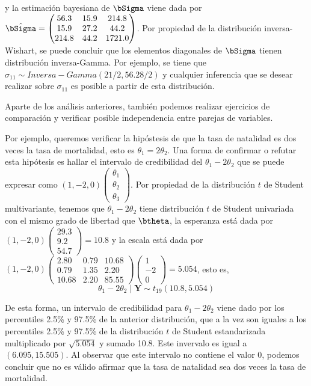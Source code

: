\begin{Eje}
y la estimación bayesiana de $\bSigma$ viene dada por $\hat{\bSigma}=\begin{pmatrix}56.3&15.9&214.8\\15.9&27.2&44.2\\214.8&44.2&1721.0\end{pmatrix}$. Por propiedad de la distribución inversa-Wishart, se puede concluir que los elementos diagonales de $\bSigma$ tienen distribución inversa-Gamma. Por ejemplo, se tiene que $\sigma_{11}\sim Inversa-Gamma(21/2, 56.28/2)$ y cualquier inferencia que se desear realizar sobre $\sigma_{11}$ es posible a partir de esta distribución. 

Aparte de los análisis anteriores, también podemos realizar ejercicios de comparación y verificar posible independencia entre parejas de variables. 

Por ejemplo, queremos verificar la hipóstesis de que la tasa de natalidad es dos veces la tasa de mortalidad, esto es $\theta_1=2\theta_2$. Una forma de confirmar o refutar esta hipótesis es hallar el intervalo de credibilidad del $\theta_1-2\theta_2$ que se puede expresar como $(1,-2,0)\begin{pmatrix}\theta_1\\ \theta_2\\ \theta_3\end{pmatrix}$. Por propiedad de la distribución $t$ de Student multivariante, tenemos que $\theta_1-2\theta_2$ tiene distribución $t$ de Student univariada con el mismo grado de libertad que $\btheta$, la esperanza está dada por $(1,-2,0)\begin{pmatrix}29.3\\9.2\\54.7\end{pmatrix}=10.8$ y la escala está dada por $(1,-2,0)\begin{pmatrix}2.80&0.79&10.68\\0.79&1.35&2.20\\10.68&2.20&85.55\end{pmatrix}\begin{pmatrix}1\\-2\\0\end{pmatrix}=5.054$, esto es, 
\begin{equation*}
\theta_1-2\theta_2 \mid \mathbf{Y}\sim t_{19}(10.8, 5.054)
\end{equation*}

De esta forma, un intervalo de credibilidad para $\theta_1-2\theta_2$ viene dado por los percentiles 2.5\% y 97.5\% de la anterior distribución, que a la vez son iguales a los percentiles 2.5\% y 97.5\% de la distribución $t$ de Student estandarizada multiplicado por $\sqrt{5.054}$ y sumado 10.8. Este invervalo es igual a $(6.095, 15.505)$. Al observar que este intervalo no contiene el valor 0, podemos concluir que no es válido afirmar que la tasa de natalidad sea dos veces la tasa de mortalidad.


\end{Eje}
